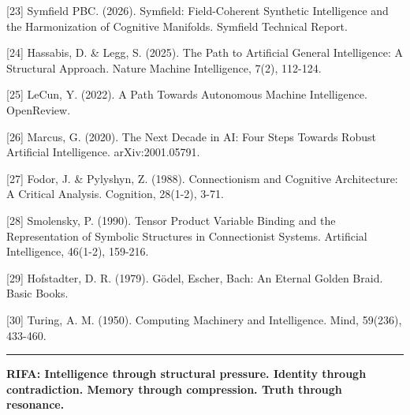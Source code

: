 \documentclass[
  11pt,
  a4paper,
]{article}
\begin{document}
{[}23{]} Symfield PBC. (2026). Symfield: Field-Coherent Synthetic
Intelligence and the Harmonization of Cognitive Manifolds. Symfield
Technical Report.

{[}24{]} Hassabis, D. \& Legg, S. (2025). The Path to Artificial General
Intelligence: A Structural Approach. Nature Machine Intelligence, 7(2),
112-124.

{[}25{]} LeCun, Y. (2022). A Path Towards Autonomous Machine
Intelligence. OpenReview.

{[}26{]} Marcus, G. (2020). The Next Decade in AI: Four Steps Towards
Robust Artificial Intelligence. arXiv:2001.05791.

{[}27{]} Fodor, J. \& Pylyshyn, Z. (1988). Connectionism and Cognitive
Architecture: A Critical Analysis. Cognition, 28(1-2), 3-71.

{[}28{]} Smolensky, P. (1990). Tensor Product Variable Binding and the
Representation of Symbolic Structures in Connectionist Systems.
Artificial Intelligence, 46(1-2), 159-216.

{[}29{]} Hofstadter, D. R. (1979). Gödel, Escher, Bach: An Eternal
Golden Braid. Basic Books.

{[}30{]} Turing, A. M. (1950). Computing Machinery and Intelligence.
Mind, 59(236), 433-460.

\begin{center}\rule{0.5\linewidth}{0.5pt}\end{center}

\textbf{RIFA: Intelligence through structural pressure. Identity through
contradiction. Memory through compression. Truth through resonance.}
\end{document}
